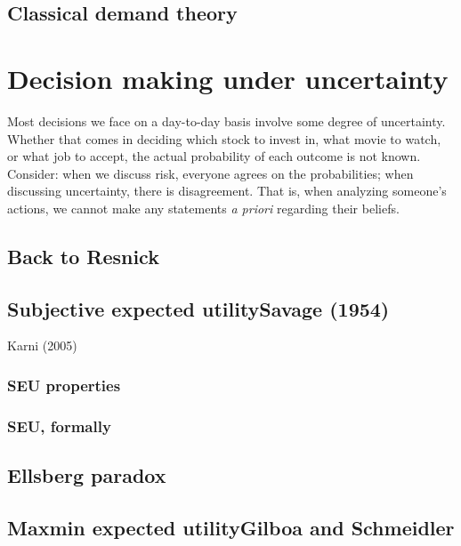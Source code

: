 \documentclass[letterpaper, 12pt, titlepage]{article}
\begin{document}
\subsection{Classical demand theory}
\label{subsec:classical-demand-theory}

\section{Decision making under uncertainty}
\label{sec:uncertainty}

Most decisions we face on a day-to-day basis involve some degree of
uncertainty. Whether that comes in deciding which stock to invest in, what movie
to watch, or what job to accept, the actual probability of each outcome is not
known. Consider: when we discuss risk, everyone agrees on the probabilities;
when discussing uncertainty, there is disagreement. That is, when analyzing
someone's actions, we cannot make any statements \emph{a priori} regarding their
beliefs.

\subsection{Back to Resnick}
\label{subsec:resnick-uncertainty}

\subsection{Subjective expected utility\textemdash Savage (1954)}
\label{subsec:savage-seu}

Karni (2005)

\subsubsection{SEU properties}
\label{subsubsec:seu-properties}

\subsubsection{SEU, formally}
\label{subsubsec:seu-proper}

\subsection{Ellsberg paradox}
\label{subsec:ellsberg-paradox}

\subsection{Maxmin expected utility\textemdash Gilboa and Schmeidler}
\label{subsec:gs-maxmin}
\end{document}

